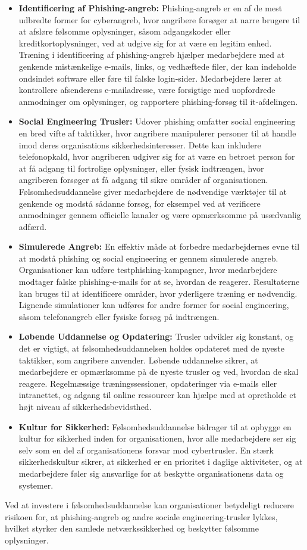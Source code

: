 \begin{itemize}
	\item \textbf{Identificering af Phishing-angreb:} Phishing-angreb er en af de mest udbredte former for cyberangreb, hvor angribere forsøger at narre brugere til at afsløre følsomme oplysninger, såsom adgangskoder eller kreditkortoplysninger, ved at udgive sig for at være en legitim enhed. Træning i identificering af phishing-angreb hjælper medarbejdere med at genkende mistænkelige e-mails, links, og vedhæftede filer, der kan indeholde ondsindet software eller føre til falske login-sider. Medarbejdere lærer at kontrollere afsenderens e-mailadresse, være forsigtige med uopfordrede anmodninger om oplysninger, og rapportere phishing-forsøg til it-afdelingen.
	
	\item \textbf{Social Engineering Trusler:} Udover phishing omfatter social engineering en bred vifte af taktikker, hvor angribere manipulerer personer til at handle imod deres organisations sikkerhedsinteresser. Dette kan inkludere telefonopkald, hvor angriberen udgiver sig for at være en betroet person for at få adgang til fortrolige oplysninger, eller fysisk indtrængen, hvor angriberen forsøger at få adgang til sikre områder af organisationen. Følsomhedsuddannelse giver medarbejdere de nødvendige værktøjer til at genkende og modstå sådanne forsøg, for eksempel ved at verificere anmodninger gennem officielle kanaler og være opmærksomme på usædvanlig adfærd.
	
	\item \textbf{Simulerede Angreb:} En effektiv måde at forbedre medarbejdernes evne til at modstå phishing og social engineering er gennem simulerede angreb. Organisationer kan udføre testphishing-kampagner, hvor medarbejdere modtager falske phishing-e-mails for at se, hvordan de reagerer. Resultaterne kan bruges til at identificere områder, hvor yderligere træning er nødvendig. Lignende simulationer kan udføres for andre former for social engineering, såsom telefonangreb eller fysiske forsøg på indtrængen.
	
	\item \textbf{Løbende Uddannelse og Opdatering:} Trusler udvikler sig konstant, og det er vigtigt, at følsomhedsuddannelsen holdes opdateret med de nyeste taktikker, som angribere anvender. Løbende uddannelse sikrer, at medarbejdere er opmærksomme på de nyeste trusler og ved, hvordan de skal reagere. Regelmæssige træningssessioner, opdateringer via e-mails eller intranettet, og adgang til online ressourcer kan hjælpe med at opretholde et højt niveau af sikkerhedsbevidsthed.
	
	\item \textbf{Kultur for Sikkerhed:} Følsomhedsuddannelse bidrager til at opbygge en kultur for sikkerhed inden for organisationen, hvor alle medarbejdere ser sig selv som en del af organisationens forsvar mod cybertrusler. En stærk sikkerhedskultur sikrer, at sikkerhed er en prioritet i daglige aktiviteter, og at medarbejdere føler sig ansvarlige for at beskytte organisationens data og systemer.
	
\end{itemize}
\noindent
Ved at investere i følsomhedsuddannelse kan organisationer betydeligt reducere risikoen for, at phishing-angreb og andre sociale engineering-trusler lykkes, hvilket styrker den samlede netværkssikkerhed og beskytter følsomme oplysninger.
